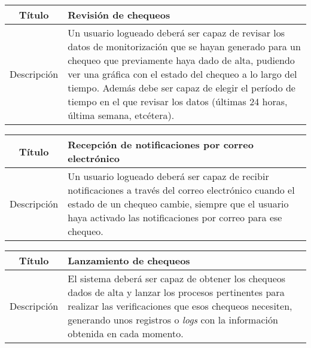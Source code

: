 \begin{center}
  
  \begin{tabularx}{\textwidth}{|c|X|}
    \hline
    Título & Revisión de chequeos \\

    \hline

    Descripción & Un usuario logueado deberá ser capaz de revisar los datos de
    monitorización que se hayan generado para un chequeo que previamente haya
    dado de alta, pudiendo ver una gráfica con el estado del chequeo a lo largo
    del tiempo. Además debe ser capaz de elegir el período de tiempo en el que
    revisar los datos (últimas 24 horas, última semana, etcétera). \\

    \hline
  \end{tabularx}
\end{center}


\begin{center}
  
  \begin{tabularx}{\textwidth}{|c|X|}
    \hline
    Título & Recepción de notificaciones por correo electrónico \\

    \hline

    Descripción & Un usuario logueado deberá ser capaz de recibir notificaciones
    a través del correo electrónico cuando el estado de un chequeo cambie,
    siempre que el usuario haya activado las notificaciones por correo para ese
    chequeo. \\

    \hline
  \end{tabularx}
\end{center}

\begin{center}
  
  \begin{tabularx}{\textwidth}{|c|X|}
    \hline
    Título & Lanzamiento de chequeos \\

    \hline

    Descripción & El sistema deberá ser capaz de obtener los chequeos dados de
    alta y lanzar los procesos pertinentes para realizar las verificaciones que
    esos chequeos necesiten, generando unos registros
    o \textit{logs} con la información obtenida en cada momento. \\

    \hline
  \end{tabularx}
\end{center}



